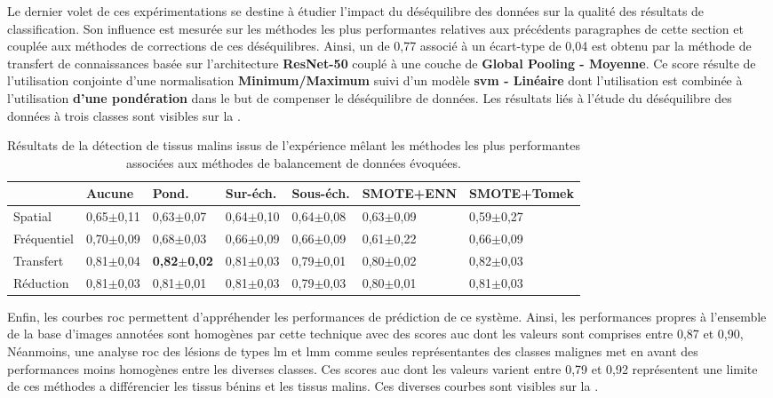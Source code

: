 Le dernier volet de ces expérimentations se destine à étudier l'impact du déséquilibre des données sur la qualité des résultats de classification. Son influence est mesurée sur les méthodes les plus performantes relatives aux précédents paragraphes de cette section et couplée aux méthodes de corrections de ces déséquilibres. Ainsi, un \fscore{} de 0,77 associé à un écart-type de 0,04 est obtenu par la méthode de transfert de connaissances basée sur l'architecture \textbf{ResNet-50} couplé à une couche de \textbf{Global Pooling - Moyenne}. Ce score résulte de l'utilisation conjointe d'une normalisation \textbf{Minimum/Maximum} suivi d'un modèle \textbf{\gls{svm} - Linéaire} dont l'utilisation est combinée à l'utilisation \textbf{d'une pondération} dans le but de compenser le déséquilibre de données. Les résultats liés à l'étude du déséquilibre des données à trois classes sont visibles sur la .\par

\begin{table}[H]
    \begin{tabular}{lllllll}
        \toprule
                    & Aucune        & Pond.                 & Sur-éch.      & Sous-éch.     & SMOTE+ENN     & SMOTE+Tomek   \\ \hline
        Spatial     & 0,65$\pm$0,11 & 0,63$\pm$0,07         & 0,64$\pm$0,10 & 0,64$\pm$0,08 & 0,63$\pm$0,09 & 0,59$\pm$0,27 \\
        Fréquentiel & 0,70$\pm$0,09 & 0,68$\pm$0,03         & 0,66$\pm$0,09 & 0,66$\pm$0,09 & 0,61$\pm$0,22 & 0,66$\pm$0,09 \\ \rowcolor[HTML]{E7E6E6} 
        Transfert   & 0,81$\pm$0,04 & \textbf{0,82$\pm$0,02}& 0,81$\pm$0,03 & 0,79$\pm$0,01 & 0,80$\pm$0,02 & 0,82$\pm$0,03 \\
        Réduction   & 0,81$\pm$0,03 & 0,81$\pm$0,01         & 0,81$\pm$0,03 & 0,79$\pm$0,03 & 0,80$\pm$0,01 & 0,81$\pm$0,03 \\ \bottomrule 
    \end{tabular}
    \caption{Résultats de la détection de tissus malins issus de l'expérience mêlant les méthodes les plus performantes associées aux méthodes de balancement de données évoquées.}
    \label{tab:results_balancement_malignant}
\end{table}\par

Enfin, les courbes \gls{roc} permettent d'appréhender les performances de prédiction de ce système. Ainsi, les performances propres à l'ensemble de la base d'images annotées sont homogènes par cette technique avec des scores \gls{auc} dont les valeurs sont comprises entre 0,87 et 0,90, Néanmoins, une analyse \gls{roc} des lésions de types \gls{lm} et \gls{lmm} comme seules représentantes des classes malignes met en avant des performances moins homogènes entre les diverses classes. Ces scores \gls{auc} dont les valeurs varient entre 0,79 et 0,92 représentent une limite de ces méthodes a différencier les tissus bénins et les tissus malins. Ces diverses courbes sont visibles sur la .\par

